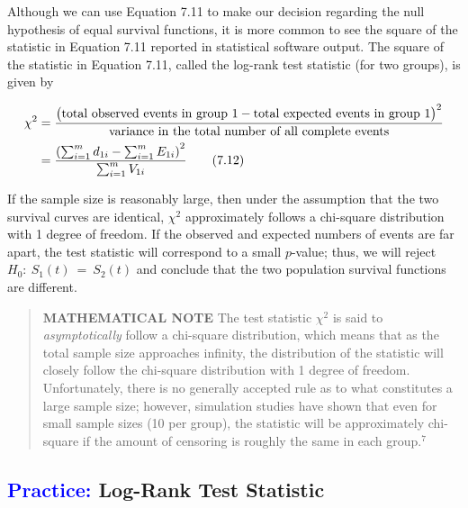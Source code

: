\documentclass[
]{report}
\begin{document}
Although we can use Equation 7.11 to make our decision regarding the null hypothesis of equal survival functions, it is more common to see the square of the statistic in Equation 7.11 reported in statistical software output. The square of the statistic in Equation 7.11, called the log-rank test statistic (for two groups), is given by

\begin{align}\label{9.12}
\chi^2 &= \frac{\bigl(\text{total observed events in group 1} - \text{total expected events in group 1}\bigr)^{2}}%
             {\text{variance in the total number of all complete events}} \notag \\
       &= \frac{\left(\sum_{i=1}^m d_{1i} - \sum_{i=1}^m E_{1i}\right)^{2}}{\sum_{i=1}^m V_{1i}}
\tag{7.12}
\end{align}

If the sample size is reasonably large, then under the assumption that the two survival curves are identical, \(\scriptstyle \chi^2\) approximately follows a chi-square distribution with 1 degree of freedom. If the observed and expected numbers of events are far apart, the test statistic will correspond to a small \(\scriptstyle p\)-value; thus, we will reject \(\scriptstyle H_0: \ S_1(t) \ =\  S_2(t)\) and conclude that the two population survival functions are different.

\begin{quote}
\textbf{MATHEMATICAL NOTE} The test statistic \(\chi^2\) is said to \emph{asymptotically} follow a chi-square distribution, which means that as the total sample size approaches infinity, the distribution of the statistic will closely follow the chi-square distribution with 1 degree of freedom. Unfortunately, there is no generally accepted rule as to what constitutes a large sample size; however, simulation studies have shown that even for small sample sizes (10 per group), the statistic will be approximately chi-square if the amount of censoring is roughly the same in each group.\(^7\)
\end{quote}

\hypertarget{log-rank-test-statistic}{%
\subsection*{\texorpdfstring{\textcolor{blue}{Practice:} Log-Rank Test Statistic}{ Log-Rank Test Statistic}}\label{log-rank-test-statistic}}
\end{document}
